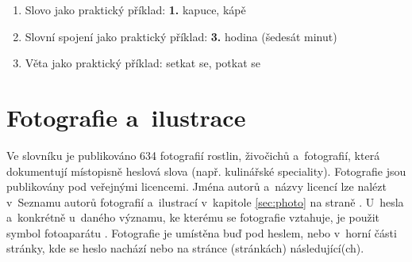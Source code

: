 \begin{enumerate}
\item Slovo jako praktický příklad:
\blspace
\dicEntry {}   \textbf{1.} {kapuce, kápě}  
\blspace
\item Slovní spojení jako praktický příklad:
\blspace
\dicEntry {}   \textbf{3.}  {hodina} {\footnotesize{(šedesát minut)}}  
\blspace
\item Věta jako praktický příklad:
\blspace
\dicEntry {}       {setkat se, potkat se}  
\end{enumerate}

\section{Fotografie a~ilustrace}

Ve slovníku je publikováno 634 fotografií rostlin, živočichů a~fotografií, která dokumentují místopisně heslová slova (např. kulinářské speciality).
Fotografie jsou publikovány pod veřejnými licencemi. Jména autorů a~názvy licencí lze nalézt v~Seznamu autorů fotografií a~ilustrací v~kapitole \ref{sec:photo} na straně \pageref{sec:photo}. U~hesla a~konkrétně u~daného významu, ke kterému se fotografie vztahuje, je použit symbol fotoaparátu \dicsymPhoto. Fotografie je umístěna buď pod heslem, nebo v~horní části stránky, kde se heslo nachází nebo na stránce (stránkách) následující(ch).

